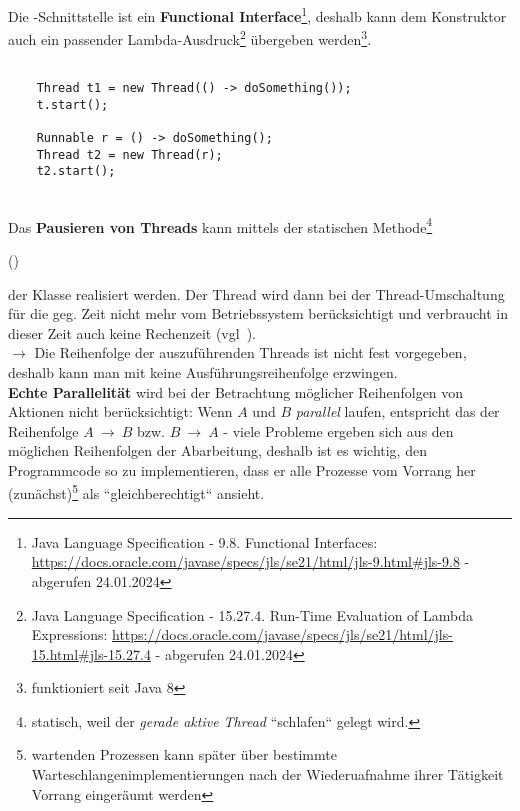 Die -Schnittstelle ist ein \textbf{Functional Interface}\footnote{
    Java Language Specification - 9.8. Functional Interfaces: \url{https://docs.oracle.com/javase/specs/jls/se21/html/jls-9.html#jls-9.8} - abgerufen 24.01.2024
}, deshalb kann dem Konstruktor auch ein passender Lambda-Ausdruck\footnote{
    Java Language Specification - 15.27.4. Run-Time Evaluation of Lambda Expressions: \url{https://docs.oracle.com/javase/specs/jls/se21/html/jls-15.html#jls-15.27.4}  - abgerufen 24.01.2024
} übergeben werden\footnote{funktioniert seit Java 8}.

\begin{verbatim}

    Thread t1 = new Thread(() -> doSomething());
    t.start();

    Runnable r = () -> doSomething();
    Thread t2 = new Thread(r);
    t2.start();

\end{verbatim}\\

Das \textbf{Pausieren von Threads} kann mittels der statischen Methode\footnote{
    statisch, weil der \textit{gerade aktive Thread} ``schlafen`` gelegt wird.
}
\begin{center}
 ()
\end{center}
der Klasse  realisiert werden.
Der Thread wird dann bei der Thread-Umschaltung für die geg. Zeit nicht mehr vom Betriebssystem berücksichtigt und verbraucht in dieser Zeit auch keine Rechenzeit (vgl~\cite[16]{Oec22}).\\

$\rightarrow$ Die Reihenfolge der auszuführenden Threads ist nicht fest vorgegeben, deshalb kann man mit  keine Ausführungsreihenfolge erzwingen.\\

\noindent
\textbf{Echte Parallelität} wird bei der Betrachtung möglicher Reihenfolgen von Aktionen nicht berücksichtigt: Wenn $A$ und $B$ \textit{parallel} laufen, entspricht das der Reihenfolge $A\ \rightarrow\ B$ bzw. $B\ \rightarrow\ A$ - viele Probleme ergeben sich aus den möglichen Reihenfolgen der Abarbeitung, deshalb ist es wichtig, den Programmcode so zu implementieren, dass er alle Prozesse vom Vorrang her (zunächst)\footnote{
wartenden Prozessen kann später über bestimmte Warteschlangenimplementierungen nach der Wiederuafnahme ihrer Tätigkeit Vorrang eingeräumt werden
} als ``gleichberechtigt`` ansieht.

